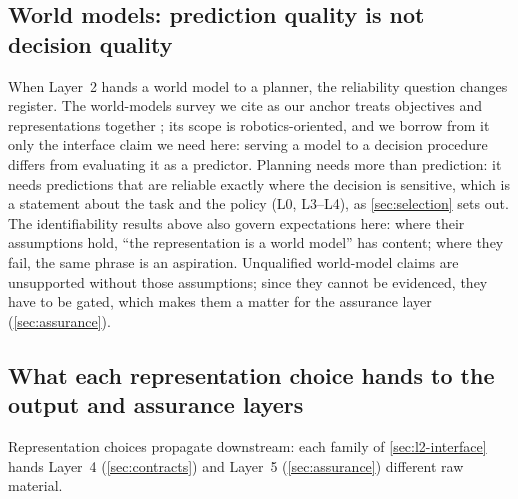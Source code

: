 \subsection{World models: prediction quality is not decision quality}
\label{sec:l2-worldmodels}

When Layer~2 hands a world model to a planner, the reliability question changes register. The
world-models survey we cite as our anchor treats objectives and representations together
\cite{id251016732}; its scope is robotics-oriented, and we borrow from it only the interface
claim we need here: serving a model to a decision procedure differs from evaluating it as a
predictor. 
Planning needs more than prediction: it needs predictions that are reliable exactly where the
decision is sensitive, which is a statement about the task and the policy (L0, L3--L4), as
\cref{sec:selection} sets out. The identifiability results above also govern
expectations here: where their assumptions hold, ``the representation is a world model'' has
content; where they fail, the same phrase is an aspiration. Unqualified world-model
claims are unsupported without those assumptions; since they cannot be evidenced, they have to
be gated, which makes them a matter for the assurance layer (\cref{sec:assurance}).

\subsection{What each representation choice hands to the output and assurance layers}
\label{sec:l2-handoff}

Representation choices propagate downstream: each family of \cref{sec:l2-interface} hands Layer~4
(\cref{sec:contracts}) and Layer~5 (\cref{sec:assurance}) different raw material.

